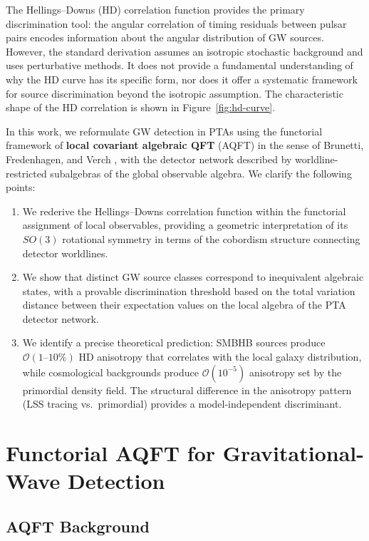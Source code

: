 \documentclass[11pt,a4paper]{article}
\begin{document}
The Hellings--Downs (HD) correlation function \cite{Hellings:1983} provides the primary discrimination tool: the angular correlation of timing residuals between pulsar pairs encodes information about the angular distribution of GW sources. However, the standard derivation assumes an isotropic stochastic background and uses perturbative methods. It does not provide a fundamental understanding of why the HD curve has its specific form, nor does it offer a systematic framework for source discrimination beyond the isotropic assumption. The characteristic shape of the HD correlation is shown in Figure~\ref{fig:hd-curve}.

In this work, we reformulate GW detection in PTAs using the functorial framework of \textbf{local covariant algebraic QFT} (AQFT) in the sense of Brunetti, Fredenhagen, and Verch \cite{Brunetti:2003}, with the detector network described by worldline-restricted subalgebras of the global observable algebra. We clarify the following points:

\begin{enumerate}
\item We rederive the Hellings--Downs correlation function within the functorial assignment of local observables, providing a geometric interpretation of its $SO(3)$ rotational symmetry in terms of the cobordism structure connecting detector worldlines.
\item We show that distinct GW source classes correspond to inequivalent algebraic states, with a provable discrimination threshold based on the total variation distance between their expectation values on the local algebra of the PTA detector network.
\item We identify a precise theoretical prediction: SMBHB sources produce $\mathcal{O}(1\text{--}10\%)$ HD anisotropy that correlates with the local galaxy distribution, while cosmological backgrounds produce $\mathcal{O}(10^{-5})$ anisotropy set by the primordial density field. The structural difference in the anisotropy pattern (LSS tracing vs.\ primordial) provides a model-independent discriminant.
\end{enumerate}


\section{Functorial AQFT for Gravitational-Wave Detection}\label{sec:framework}

\subsection{AQFT Background}\label{sec:aqft}
\end{document}
